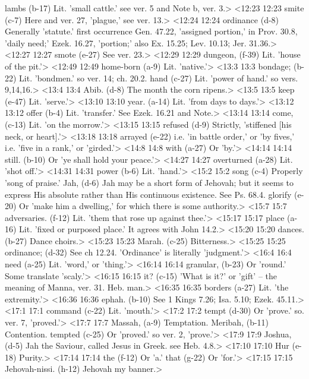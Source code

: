  lambs (b-17)  Lit. 'small cattle.' see ver. 5 and Note b, ver. 3.>
<12:23 12:23  smite (c-7)  Here and ver. 27, 'plague,' see ver. 13.>
<12:24 12:24  ordinance (d-8)  Generally 'statute.' first occurrence Gen. 47.22, 'assigned  portion,' in Prov. 30.8, 'daily need;' Ezek. 16.27, 'portion;'  also Ex. 15.25; Lev. 10.13; Jer. 31.36.>
<12:27 12:27  smote (e-27)  See ver. 23.>
<12:29 12:29  dungeon, (f-39)  Lit. 'house of the pit.'>
<12:49 12:49  home-born (a-9)  Lit. 'native.'>
<13:3 13:3  bondage; (b-22)  Lit. 'bondmen.' so ver. 14; ch. 20.2.
  hand (c-27)  Lit. 'power of hand.' so vers. 9,14,16.>
<13:4 13:4  Abib. (d-8)  The month the corn ripens.>
<13:5 13:5  keep (e-47)  Lit. 'serve.'>
<13:10 13:10  year. (a-14)  Lit. 'from days to days.'>
<13:12 13:12  offer (b-4)  Lit. 'transfer.' See Ezek. 16.21 and Note.>
<13:14 13:14  come, (c-13)  Lit. 'on the morrow.'>
<13:15 13:15  refused (d-9)  Strictly, 'stiffened [his neck, or heart].'>
<13:18 13:18  arrayed (e-22)  i.e. 'in battle order,' or 'by fives,' i.e. 'five in a rank,'  or 'girded.'>
<14:8 14:8  with (a-27)  Or 'by.'>
<14:14 14:14  still. (b-10)  Or 'ye shall hold your peace.'>
<14:27 14:27  overturned (a-28)  Lit. 'shot off.'>
<14:31 14:31  power (b-6)  Lit. 'hand.'>
<15:2 15:2  song (c-4)  Properly 'song of praise.'
  Jah, (d-6)  Jah may be a short form of Jehovah; but it seems to express  His absolute rather than His continuous existence. See Ps.  68.4.
  glorify (e-20)  Or 'make him a dwelling,' for which there is some authority.>
<15:7 15:7  adversaries. (f-12)  Lit. 'them that rose up against thee.'>
<15:17 15:17  place (a-16)  Lit. 'fixed or purposed place.' It agrees with John 14.2.>
<15:20 15:20  dances. (b-27)  Dance choirs.>
<15:23 15:23  Marah. (c-25)  Bitterness.>
<15:25 15:25  ordinance; (d-32)  See ch 12.24. 'Ordinance' is literally 'judgment.'>
<16:4 16:4  need (a-25)  Lit. 'word,' or 'thing.'>
<16:14 16:14  granular, (b-23)  Or 'round.' Some translate 'scaly.'>
<16:15 16:15  it? (c-15)  'What is it?' or 'gift' -- the meaning of Manna, ver. 31.  Heb. man.>
<16:35 16:35  borders (a-27)  Lit. 'the extremity.'>
<16:36 16:36  ephah. (b-10)  See 1 Kings 7.26; Isa. 5.10; Ezek. 45.11.>
<17:1 17:1  command (c-22)  Lit. 'mouth.'>
<17:2 17:2  tempt (d-30)  Or 'prove.' so. ver. 7, 'proved.'>
<17:7 17:7  Massah, (a-9)  Temptation.
  Meribah, (b-11)  Contention.
  tempted (c-25)  Or 'proved.' so ver. 2, 'prove.'>
<17:9 17:9  Joshua, (d-5)  Jah the Saviour, called Jesus in Greek. see Heb. 4.8.>
<17:10 17:10  Hur (e-18)  Purity.>
<17:14 17:14  the (f-12)  Or 'a.'
  that (g-22)  Or 'for.'>
<17:15 17:15  Jehovah-nissi. (h-12)  Jehovah my banner.>
